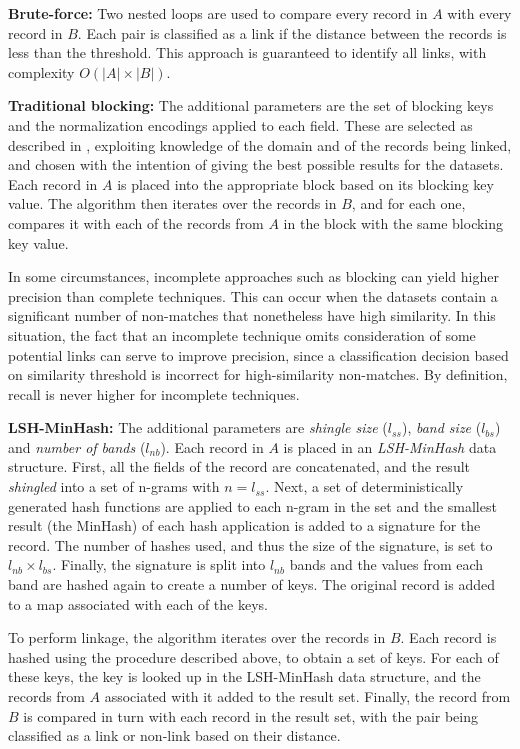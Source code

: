 \documentclass{llncs}
\begin{document}
\textbf{Brute-force:}
Two nested loops are used to compare every record in $A$ with every
record in $B$. Each pair is classified as a link if the distance between
the records is less than the threshold. This approach is guaranteed to
identify all links, with complexity $ O(|A| \times |B|) $.

\textbf{Traditional blocking:}
The additional parameters are the set of blocking keys and the
normalization encodings applied to each field. These are selected as
described in \cite{Chr12b}, exploiting knowledge of the domain and of
the records being linked, and chosen with the intention of giving the
best possible results for the datasets. Each record in $A$ is placed
into the appropriate block based on its blocking key value. The
algorithm then iterates over the records in $B$, and for each one,
compares it with each of the records from $A$ in the block with the same
blocking key value.

In some circumstances, incomplete approaches such as blocking can yield
higher precision than complete techniques. This can occur when the
datasets contain a significant number of non-matches that nonetheless
have high similarity. In this situation, the fact that an incomplete
technique omits consideration of some potential links can serve to
improve precision, since a classification decision based on similarity
threshold is incorrect for high-similarity non-matches. By definition,
recall is never higher for incomplete techniques.

\textbf{LSH-MinHash:}
The additional parameters are \emph{shingle size} ($l_{ss}$), \emph{band
size} ($l_{bs}$) and \emph{number of bands} ($l_{nb}$). Each record in
$A$ is placed in an \emph{LSH-MinHash} data structure. First, all the
fields of the record are concatenated, and the result \emph{shingled}
into a set of n-grams with $n = l_{ss}$. Next, a set of
deterministically generated hash functions are applied to each n-gram in
the set and the smallest result (the MinHash) of each hash application
is added to a signature for the record. The number of hashes used, and
thus the size of the signature, is set to $l_{nb} \times l_{bs}$.
Finally, the signature is split into $l_{nb}$ bands and the values from
each band are hashed again to create a number of keys. The original
record is added to a map associated with each of the keys. 

To perform linkage, the algorithm iterates over the records in $B$. Each
record is hashed using the procedure described above, to obtain a set of
keys. For each of these keys, the key is looked up in the LSH-MinHash
data structure, and the records from $A$ associated with it added to the
result set. Finally, the record from $B$ is compared in turn with each
record in the result set, with the pair being classified as a link or
non-link based on their distance.
\end{document}
